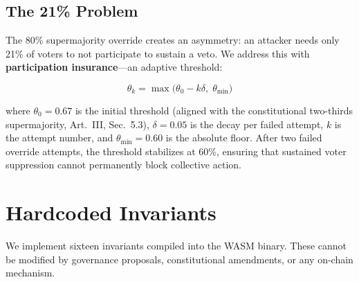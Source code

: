 \documentclass[11pt,a4paper]{article}
\begin{document}
\subsection{The 21\% Problem}
\label{sec:insurance}

The 80\% supermajority override creates an asymmetry: an attacker needs only 21\% of voters to not participate to sustain a veto. We address this with \textbf{participation insurance}---an adaptive threshold:

\begin{equation}
    \theta_k = \max\!\big(\theta_0 - k\delta,\; \theta_{\min}\big)
    \label{eq:insurance}
\end{equation}

\noindent where $\theta_0 = 0.67$ is the initial threshold (aligned with the constitutional two-thirds supermajority, Art.~III, Sec.~5.3), $\delta = 0.05$ is the decay per failed attempt, $k$ is the attempt number, and $\theta_{\min} = 0.60$ is the absolute floor. After two failed override attempts, the threshold stabilizes at 60\%, ensuring that sustained voter suppression cannot permanently block collective action.

\section{Hardcoded Invariants}
\label{sec:invariants}

We implement sixteen invariants compiled into the WASM binary. These cannot be modified by governance proposals, constitutional amendments, or any on-chain mechanism.
\end{document}
